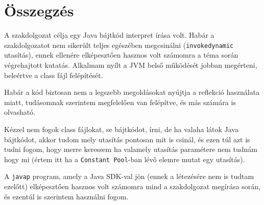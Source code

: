 \chapter{Összegzés}
\label{ch:sum}

A szakdolgozat célja egy Java bájtkód interpret írása volt. Habár a szakdolgozatot nem sikerült teljes egészében megcsinálni (\lstinline{invokedynamic} utasítás), ennek ellenére elképesztően hasznos volt számomra a téma során végrehajtott kutatás. Alkalmam nyílt a JVM belső működését jobban megérteni, beleértve a class fájl felépítését.

Habár a kód biztosan nem a legszebb megoldásokat nyújtja a reflekció használata miatt, tudásomnak szerintem megfelelően van felépítve, és más számára is olvasható.

Kézzel nem fogok class fájlokat, se bájtkódot, írni, de ha valaha látok Java bájtkódot, akkor tudom mely utasítás pontosan mit is csinál, és ezen túl azt is tudni fogom, hogy merre keressem ha valamely utasítás paramétere nem tudnám hogy mi (értem itt ha a \lstinline{Constant Pool}-ban lévő elemre mutat egy utasítás).

A \lstinline{javap} program, amely a Java SDK-val jön (ennek a létezésére nem is tudtam ezelőtt) elképesztően hasznos volt számomra mind a szakdolgozat megírása során, és ezentúl is szerintem használni fogom.